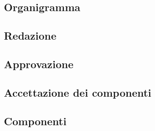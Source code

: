 \begin{appendices}
\section{Organigramma}
\subsection{Redazione}
\subsection{Approvazione}
\subsection{Accettazione dei componenti}
\subsection{Componenti}
\end{appendices}